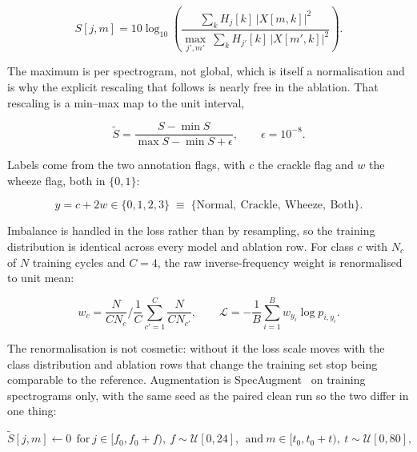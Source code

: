 \documentclass[journal,onecolumn]{IEEEtran}
\begin{document}
\begin{equation}
S[j,m] = 10\log_{10}\!\left(\frac{\sum_{k} H_j[k]\,\lvert X[m,k]\rvert^{2}}
{\displaystyle\max_{j',m'}\ \sum_{k} H_{j'}[k]\,\lvert X[m',k]\rvert^{2}}\right).
\label{eq:logmel}
\end{equation}

The maximum is per spectrogram, not global, which is itself a normalisation and is why the
explicit rescaling that follows is nearly free in the ablation. That rescaling is a min--max
map to the unit interval,

\begin{equation}
\tilde{S} = \frac{S - \min S}{\max S - \min S + \epsilon}, \qquad \epsilon = 10^{-8}.
\label{eq:minmax}
\end{equation}

Labels come from the two annotation flags, with $c$ the crackle flag and $w$ the wheeze flag,
both in $\{0,1\}$:

\begin{equation}
y = c + 2w \in \{0,1,2,3\} \;\equiv\; \{\text{Normal},\ \text{Crackle},\ \text{Wheeze},\ \text{Both}\}.
\label{eq:label}
\end{equation}

Imbalance is handled in the loss rather than by resampling, so the training distribution is
identical across every model and ablation row. For class $c$ with $N_c$ of $N$ training cycles
and $C = 4$, the raw inverse-frequency weight is renormalised to unit mean:

\begin{equation}
w_c = \frac{N}{C N_c} \bigg/ \frac{1}{C}\sum_{c'=1}^{C}\frac{N}{C N_{c'}},
\qquad
\mathcal{L} = -\frac{1}{B}\sum_{i=1}^{B} w_{y_i}\log p_{i,y_i}.
\label{eq:weights}
\end{equation}

The renormalisation is not cosmetic: without it the loss scale moves with the class
distribution and ablation rows that change the training set stop being comparable to the
reference. Augmentation is SpecAugment~\cite{park2019specaugment} on training spectrograms
only, with the same seed as the paired clean run so the two differ in one thing:

\begin{equation}
\tilde{S}[j,m] \leftarrow 0 \ \ \text{for}\ j \in [f_0, f_0{+}f),\ f \sim \mathcal{U}[0,24],
\ \ \text{and}\ m \in [t_0, t_0{+}t),\ t \sim \mathcal{U}[0,80],
\label{eq:specaug}
\end{equation}
\end{document}
